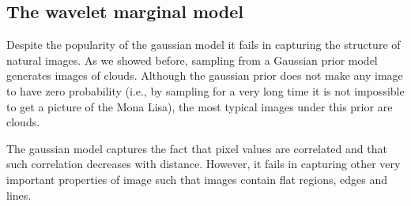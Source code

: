 %
%
%
%
%
%
%
%
%
%
%
%
%
%
\subsection{The wavelet marginal model}

Despite the popularity of the gaussian model it fails in capturing the structure of natural images. As we showed before, sampling from a Gaussian prior model generates images of clouds. Although the gaussian prior does not make any image to have zero probability (i.e., by sampling for a very long time it is not impossible to get a picture of the Mona Lisa), the most typical images under this prior are clouds. 

The gaussian model captures the fact that pixel values are correlated and that such correlation decreases with distance. However, it fails in capturing other very important properties of image such that images contain flat regions, edges and lines.

